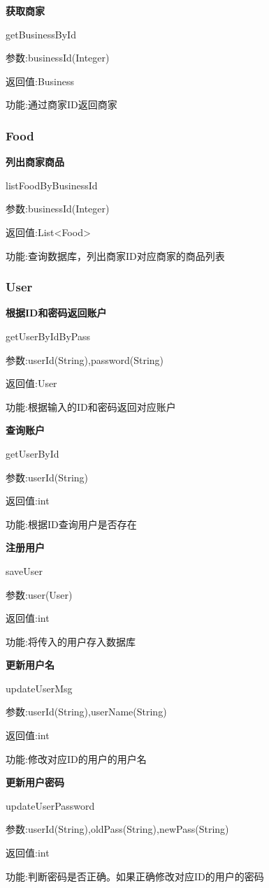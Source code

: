 \textbf{获取商家}

getBusinessById

参数:businessId(Integer)

返回值:Business

功能:通过商家ID返回商家

\subsubsection{Food}
\textbf{列出商家商品}

listFoodByBusinessId

参数:businessId(Integer)

返回值:List<Food>

功能:查询数据库，列出商家ID对应商家的商品列表

\subsubsection{User}
\textbf{根据ID和密码返回账户}

getUserByIdByPass

参数:userId(String),password(String)

返回值:User

功能:根据输入的ID和密码返回对应账户

\textbf{查询账户}

getUserById

参数:userId(String)

返回值:int

功能:根据ID查询用户是否存在

\textbf{注册用户}

saveUser

参数:user(User)

返回值:int

功能:将传入的用户存入数据库

\textbf{更新用户名}

updateUserMsg

参数:userId(String),userName(String)

返回值:int

功能:修改对应ID的用户的用户名

\textbf{更新用户密码}

updateUserPassword

参数:userId(String),oldPass(String),newPass(String)

返回值:int

功能:判断密码是否正确。如果正确修改对应ID的用户的密码

